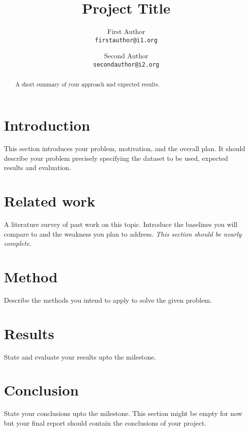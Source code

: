 \documentclass[10pt,twocolumn,letterpaper]{article}
\title{Project Title}
\author{First Author\\
{\tt\small firstauthor@i1.org}
\and
Second Author\\
{\tt\small secondauthor@i2.org}
}
\begin{document}
\maketitle
\begin{abstract}
A short summary of your approach and expected results.
\end{abstract}

\section{Introduction}
This section introduces your problem, motivation, and the overall plan. It should describe your problem precisely specifying the dataset to be used, expected results and evaluation.

\section{Related work}
A literature survey of past work on this topic. Introduce the baselines you will compare to and the weakness you plan to address. \emph{This section should be nearly complete.}

\section{Method}
Describe the methods you intend to apply to solve the given problem.

\section{Results}
State and evaluate your results upto the milestone.

\section{Conclusion}
State your conclusions upto the milestone. This section might be empty for now but your final report should contain the conclusions of your project.
{
    \small
    
    
}
\end{document}
